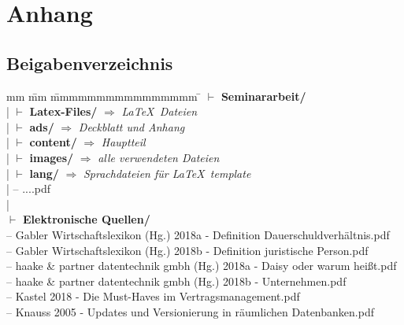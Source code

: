 
\chapter{Anhang}
\section{Beigabenverzeichnis }
\begin{tabbing}
	mm \= mm \= mmmmmmmmmmmmmmmm \= \kill
	$\vdash$ \textbf{Seminararbeit/} \\ 
	| \>  $\vdash$ \textbf{Latex-Files/}   $\Rightarrow$ \textit{ \LaTeX~Dateien}\\ 
	|\> \>  $\vdash$  \textbf{ads/}   	\> $\Rightarrow$ \textit{Deckblatt und Anhang}\\
	| \> \>  $\vdash$  \textbf{content/}  \> $\Rightarrow$ \textit{Hauptteil}\\
	| \> \>  $\vdash$  \textbf{images/}   \> $\Rightarrow$ \textit{alle verwendeten Dateien}\\
	| \> \>  $\vdash$  \textbf{lang/}    \> $\Rightarrow$ \textit{Sprachdateien für \LaTeX~template}\\
	|\> -- ....pdf\\
	|\\
	$\vdash$ \textbf{Elektronische Quellen/} \\ %
	\>  -- Gabler Wirtschaftslexikon (Hg.) 2018a - Definition Dauerschuldverhältnis.pdf \\
	\>  -- Gabler Wirtschaftslexikon (Hg.) 2018b - Definition juristische Person.pdf\\
	\>  -- haake \& partner datentechnik gmbh (Hg.) 2018a - Daisy oder warum heißt.pdf\\
	\>  -- haake \& partner datentechnik gmbh (Hg.) 2018b - Unternehmen.pdf\\
	\>  -- Kastel 2018 - Die Must-Haves im Vertragsmanagement.pdf\\
	\>  -- Knauss 2005 - Updates und Versionierung in räumlichen Datenbanken.pdf\\
\end{tabbing}
